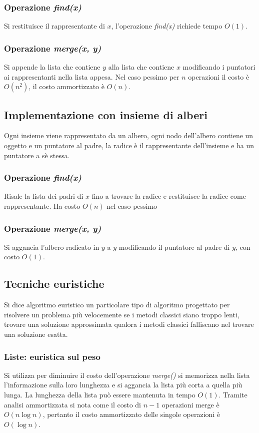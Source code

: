 \subsubsection{Operazione \emph{find(x)}}
Si restituisce il rappresentante di $x$, l'operazione \emph{find(x)} richiede tempo $O(1)$.
\subsubsection{Operazione \emph{merge(x, y)}}
Si appende la lista che contiene $y$ alla lista che contiene $x$ modificando i puntatori ai rappresentanti nella lista appesa. Nel caso pessimo per $n$ operazioni il costo \`e $O(n^2)$, il costo ammortizzato \`e
$O(n)$.
\subsection{Implementazione con insieme di alberi}
Ogni insieme viene rappresentato da un albero, ogni nodo dell'albero contiene un oggetto e un puntatore al padre, la radice \`e il rappresentante dell'insieme e ha un puntatore a s\`e stessa.
\subsubsection{Operazione \emph{find(x)}}
Risale la lista dei padri di $x$ fino a trovare la radice e restituisce la radice come rappresentante. Ha costo $O(n)$ nel caso pessimo
\subsubsection{Operazione \emph{merge(x, y)}}
Si aggancia l'albero radicato in $y$ a $y$ modificando il puntatore al padre di $y$, con costo $O(1)$.
\subsection{Tecniche euristiche}
Si dice algoritmo euristico un particolare tipo di algoritmo progettato per risolvere un problema pi\`u velocemente se i metodi classici siano troppo lenti, trovare una soluzione approssimata qualora i metodi 
classici falliscano nel trovare una soluzione esatta. 
\subsubsection{Liste: euristica sul peso}
Si utilizza per diminuire il costo dell'operazione \emph{merge()} si memorizza nella lista l'informazione sulla loro lunghezza e si aggancia la lista pi\`u corta a quella pi\`u lunga. La lunghezza della lista pu\`o 
essere mantenuta in tempo $O(1)$. Tramite analisi ammortizzata si nota come il costo di $n-1$ operazioni merge \`e $O(n\log n)$, pertanto il costo ammortizzato delle singole operazioni \`e $O(\log n)$.
